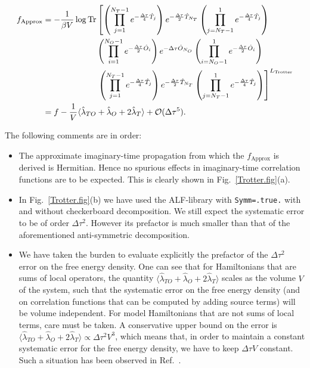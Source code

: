 \begin{align}
f_{\text{Approx} }  &=  
\begin{aligned}[t]
   -\frac{1}{\beta V } \log \mathop{\mathrm{Tr}} &\left[ \left(\prod_{j=1}^{N_T-1} e^{-\frac{\Delta \tau}{4} \hat{T}_j } \right)    e^{-\frac{\Delta \tau}{2} \hat{T}_{N_T} }    
   \left(  \prod_{j=N_T-1}^{1} e^{-\frac{\Delta \tau}{4} \hat{T}_j } \right)     \right. \nonumber \\   
   &\left(\prod_{i=1}^{N_O-1} e^{-\frac{\Delta \tau}{2} \hat{O}_i } \right)    e^{-\Delta \tau \hat{O}_{N_O} }    
     \left( \prod_{i=N_O-1}^{1} e^{-\frac{\Delta \tau}{2} \hat{O}_i } \right)   \nonumber  \\
   &\left.   \left(\prod_{j=1}^{N_T-1} e^{-\frac{\Delta \tau}{4} \hat{T}_j } \right)    e^{-\frac{\Delta \tau}{2} \hat{T}_{N_T} }    
   \left(  \prod_{j=N_T-1}^{1} e^{-\frac{\Delta \tau}{4} \hat{T}_j } \right)   
   \right]^{L_{\text{Trotter}}}  \nonumber 
\end{aligned}\\
   &= f    - \frac{1}{V}   \langle \hat{\lambda}_{TO} + \hat{\lambda}_{O} + 2 \hat{\lambda}_{T} \rangle  + \mathcal{O}( \Delta \tau ^5).
\end{align}

The following comments are in order:
\begin{itemize}
\item   The approximate imaginary-time propagation from which the $f_{\text{Approx} } $ is derived is Hermitian.  Hence no spurious effects in imaginary-time correlation functions are to be expected.  This is clearly shown in Fig.~\ref{Trotter.fig}(a).
\item  In Fig.~\ref{Trotter.fig}(b) we  have used the ALF-library with   \texttt{Symm=.true.}  with and without checkerboard decomposition.  We still expect the systematic error to be of order $\Delta \tau ^2 $.  However its prefactor is much smaller than that of the aforementioned  anti-symmetric decomposition.
\item   We have taken the burden to evaluate explicitly the prefactor of the $\Delta \tau ^2$ error on the free energy density.  One can  see that for Hamiltonians  that are sums of local  operators, the quantity $ \langle \hat{\lambda}_{TO} + \hat{\lambda}_{O} + 2 \hat{\lambda}_{T} \rangle  $ scales as the volume $V$  of the system, such that the systematic error on the free energy density (and on correlation functions that can be computed  by adding source terms)  will be  volume  independent. For model  Hamiltonians that are not sums of local terms, care must be taken.  A conservative upper bound on the  error is $ \langle \hat{\lambda}_{TO} + \hat{\lambda}_{O} + 2 \hat{\lambda}_{T} \rangle    \propto \Delta \tau^2 V^3 $, which means that, in order to maintain a constant systematic error for the free energy density, we have to keep $ \Delta \tau V $ constant. Such a situation has been observed in Ref.~\cite{WangZ20}.
\end{itemize}



